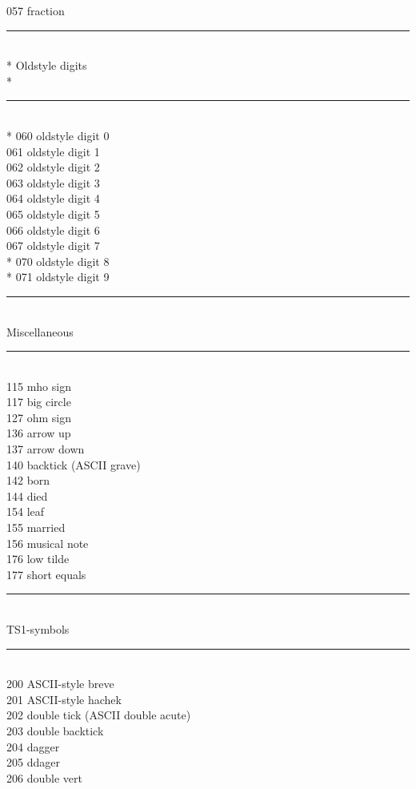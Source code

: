 \documentclass{article}
\renewcommand{\-}{\discretionary{\char'0177 }{}{}}
\begin{document}
\begin{tabbing}
057 \> fraction       \\
\rule{\linewidth}{.4pt}\>\\*
Oldstyle digits \>\\*
\rule{\linewidth}{.4pt}\>\\*
060 \> oldstyle digit 0 \\
061 \> oldstyle digit 1 \\
062 \> oldstyle digit 2 \\
063 \> oldstyle digit 3 \\
064 \> oldstyle digit 4 \\
065 \> oldstyle digit 5 \\
066 \> oldstyle digit 6 \\
067 \> oldstyle digit 7 \\*
070 \> oldstyle digit 8 \\*
071 \> oldstyle digit 9 \\
\rule{\linewidth}{.4pt}\>\\
Miscellaneous\>\\
\rule{\linewidth}{.4pt}\>\\
115 \> mho sign    \\
117 \> big circle  \\
127 \> ohm sign    \\
136 \> arrow up    \\
137 \> arrow down  \\
140 \> backtick (ASCII grave)  \\
142 \> born        \\ 
144 \> died        \\ 
154 \> leaf        \\ 
155 \> married     \\ 
156 \> musical note\\ 
176 \> low tilde   \\
177 \> short equals\\
\rule{\linewidth}{.4pt}\>\\
TS1-symbols \>\\
\rule{\linewidth}{.4pt}\>\\
200 \> ASCII-style breve \\
201 \> ASCII-style hachek\\
202 \> double tick (ASCII double acute) \\
203 \> double backtick   \\
204 \> dagger   \\
205 \> ddager   \\
206 \> double vert \\

\end{tabbing}
\end{document}
